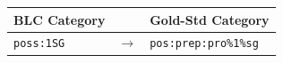 \begin{description}

\begin{table}[tb]
\centering
\begin{tabular}{lll}
	\toprule
	BLC Category & & Gold-Std Category \\
	\midrule
	\texttt{poss:1SG} & $\to$ & \texttt{pos:prep:pro\%1\%sg}  \\
	\bottomrule  
\end {tabular}
\end{table}
    

\end{description}
